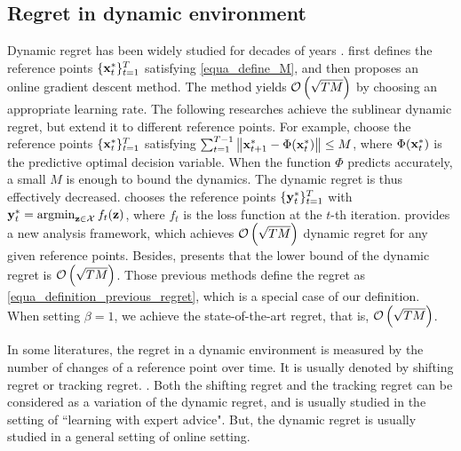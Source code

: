 \documentclass{article}
\begin{document}
{\subsection{Regret in dynamic environment}

Dynamic regret has been widely studied for decades of years \citep{Zinkevich:2003,Hall:2015ct,Hall:2013vr,Jadbabaie:2015wg,Yang:2016ud,Bedi:2018te,Zhang:2016wl,Mokhtari:2016jz,Zhang:2018tu,Gyorgy:2016,NIPS2016_6536,Zhao:2018wx}.  \citet{Zinkevich:2003} first defines the reference points $\{{\bf x}_t^{\ast}\}_{t=1}^T$ satisfying \eqref{equa_define_M}, and then proposes an online gradient descent method. The method yields ${\mathcal{O}\left( \sqrt{TM} \right)}$ by choosing an appropriate learning rate. The following researches achieve the sublinear dynamic regret, but extend it to different reference points. For example, \citet{Hall:2015ct,Hall:2013vr} choose the reference points $\{{\bf x}_t^{\ast}\}_{t=1}^T$ satisfying $\sum_{t=1}^{T-1} \left\lVert{\bf x}_{t+1}^\ast - \Phi({\bf x}_t^\ast)\right\rVert \le M$, where $\Phi({\bf x}_t^\ast)$ is the predictive optimal decision variable. When the function $\Phi$ predicts accurately, a small $M$ is enough to bound the dynamics. The dynamic regret is thus effectively decreased. \citet{Jadbabaie:2015wg,Yang:2016ud,Bedi:2018te,Zhang:2016wl,Mokhtari:2016jz,Zhang:2018tu} chooses the reference points $\{{\bf y}_t^{\ast}\}_{t=1}^T$ with $\y_t^{\ast} = \argmin_{\z\in\Xcal} f_t(\z)$, where $f_t$ is the loss function at the $t$-th iteration. \citet{Gyorgy:2016} provides a new analysis framework, which achieves ${\mathcal{O}\left( \sqrt{TM} \right)}$ dynamic regret for any given reference points. Besides, \citet{Zhao:2018wx} presents that the lower bound of the dynamic regret is ${\mathcal{O}\left( \sqrt{TM} \right)}$. Those previous methods define the regret as \eqref{equa_definition_previous_regret}, which is a special case of our definition. When setting $\beta = 1$, we achieve the state-of-the-art regret, that is, ${\mathcal{O}\left( \sqrt{TM} \right)}$. 

In some literatures, the regret in a dynamic environment is measured by the number of changes of a reference point over time. It is usually denoted by shifting regret or tracking regret. \citep{Herbster1998,Gyorgy:2005wo,Gyorgy:2012wa,Gyorgy:2016,Mourtada:2017vn,JMLR:v17:13-533,NIPS2016_6536,cesabianchi:hal,pmlr-v84-mohri18a,pmlr-v54-jun17a}. Both the shifting regret and the tracking regret can be considered as a variation of the dynamic regret, and is usually studied in the setting of ``learning with expert advice". But, the dynamic regret is usually studied in a general setting of online setting.



}
\end{document}
